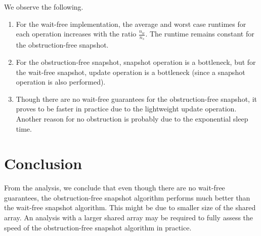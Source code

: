 \documentclass[conference,compsoc]{IEEEtran}
\begin{document}
We observe the following.
\begin{enumerate}
    \item For the wait-free implementation, the average and worst case runtimes
    for each operation increases with the ratio \(\frac{n_w}{n_s}\). The runtime
    remains constant for the obstruction-free snapshot.
    \item For the obstruction-free snapshot, snapshot operation is a bottleneck,
    but for the wait-free snapshot, update operation is a bottleneck (since a
    snapshot operation is also performed).
    \item Though there are no wait-free guarantees for the obstruction-free
    snapshot, it proves to be faster in practice due to the lightweight update
    operation. Another reason for no obstruction is probably due to the
    exponential sleep time.
\end{enumerate}

\section{Conclusion}
\label{sec:conclusion}

From the analysis, we conclude that even though there are no wait-free
guarantees, the obstruction-free snapshot algorithm performs much better than
the wait-free snapshot algorithm. This might be due to smaller size of the
shared array. An analysis with a larger shared array may be required to fully
assess the speed of the obstruction-free snapshot algorithm in practice.
\end{document}
